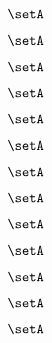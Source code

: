 \begin{forslides}
    \begin{equation}
        \label{eq:slides-processes-57}
        \setA
    \end{equation}

    \begin{equation}
        \label{eq:slides-processes-58}
        \setA
    \end{equation}

    \begin{equation}
        \label{eq:slides-processes-59}
        \setA
    \end{equation}

    \begin{equation}
        \label{eq:slides-processes-60}
        \setA
    \end{equation}

    \begin{equation}
        \label{eq:slides-processes-61}
        \setA
    \end{equation}

    \begin{equation}
        \label{eq:slides-processes-62}
        \setA
    \end{equation}

    \begin{equation}
        \label{eq:slides-processes-63}
        \setA
    \end{equation}

    \begin{equation}
        \label{eq:slides-processes-64}
        \setA
    \end{equation}

    \begin{equation}
        \label{eq:slides-processes-65}
        \setA
    \end{equation}

    \begin{equation}
        \label{eq:slides-processes-66}
        \setA
    \end{equation}

    \begin{equation}
        \label{eq:slides-processes-67}
        \setA
    \end{equation}

    \begin{equation}
        \label{eq:slides-processes-68}
        \setA
    \end{equation}

    \begin{equation}
        \label{eq:slides-processes-69}
        \setA
    \end{equation}


\end{forslides}
